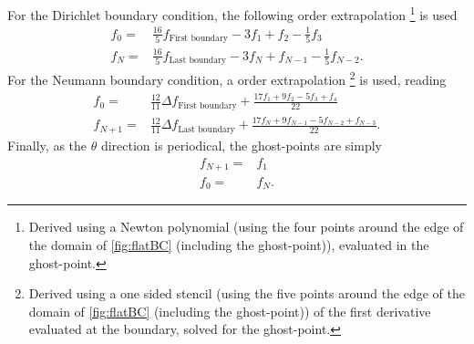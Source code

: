 For the Dirichlet boundary condition, the following  order extrapolation%
%
\footnote{
    Derived using a Newton polynomial (using the four points around the edge of the domain of \cref{fig:flatBC} (including the ghost-point)), evaluated in the ghost-point.
} %
is used
%
\begin{align*}
      f_{0} =& \frac{16}{5}f_{\text{First boundary}}
              - 3          f_1
              +            f_2
              - \frac{1}{5}f_3
    \\
      f_{N} =& \frac{16}{5}f_{\text{Last boundary}}
              - 3          f_{N}
              +            f_{N-1}
              - \frac{1}{5}f_{N-2}.
\end{align*}
%
For the Neumann boundary condition, a  order extrapolation%
%
\footnote{
    Derived using a one sided stencil (using the five points around the edge of the domain of \cref{fig:flatBC} (including the ghost-point)) of the first derivative evaluated at the boundary, solved for the ghost-point.
} %
%
is used, reading
%
\begin{align*}
      f_0 =& \frac{12}{11}\Delta f_{\text{First boundary}}
                +
                \frac{
                  17f_1
                +  9f_2
                -  5f_3
                +   f_4
               }{22}
    \\
      f_{N+1} =& \frac{12}{11}\Delta f_{\text{Last boundary}}
                +
                \frac{
                  17f_{N}
                +  9f_{N-1}
                -  5f_{N-2}
                +   f_{N-3}
               }{22}.
\end{align*}
%
Finally, as the $\theta$ direction is periodical, the ghost-points are simply
%
\begin{align*}
    f_{N+1} =& f_{1}
    \\
    f_{0} =& f_{N}.
\end{align*}
